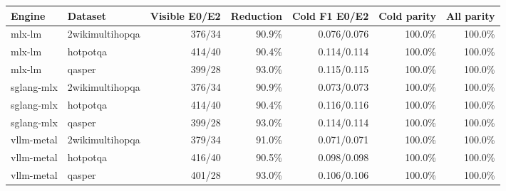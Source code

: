 \begin{tabular}{llrrrrr}
\toprule
Engine & Dataset & Visible E0/E2 & Reduction & Cold F1 E0/E2 & Cold parity & All parity \\
\midrule
mlx-lm & 2wikimultihopqa & 376/34 & 90.9\% & 0.076/0.076 & 100.0\% & 100.0\% \\
mlx-lm & hotpotqa & 414/40 & 90.4\% & 0.114/0.114 & 100.0\% & 100.0\% \\
mlx-lm & qasper & 399/28 & 93.0\% & 0.115/0.115 & 100.0\% & 100.0\% \\
sglang-mlx & 2wikimultihopqa & 376/34 & 90.9\% & 0.073/0.073 & 100.0\% & 100.0\% \\
sglang-mlx & hotpotqa & 414/40 & 90.4\% & 0.116/0.116 & 100.0\% & 100.0\% \\
sglang-mlx & qasper & 399/28 & 93.0\% & 0.114/0.114 & 100.0\% & 100.0\% \\
vllm-metal & 2wikimultihopqa & 379/34 & 91.0\% & 0.071/0.071 & 100.0\% & 100.0\% \\
vllm-metal & hotpotqa & 416/40 & 90.5\% & 0.098/0.098 & 100.0\% & 100.0\% \\
vllm-metal & qasper & 401/28 & 93.0\% & 0.106/0.106 & 100.0\% & 100.0\% \\
\bottomrule
\end{tabular}
